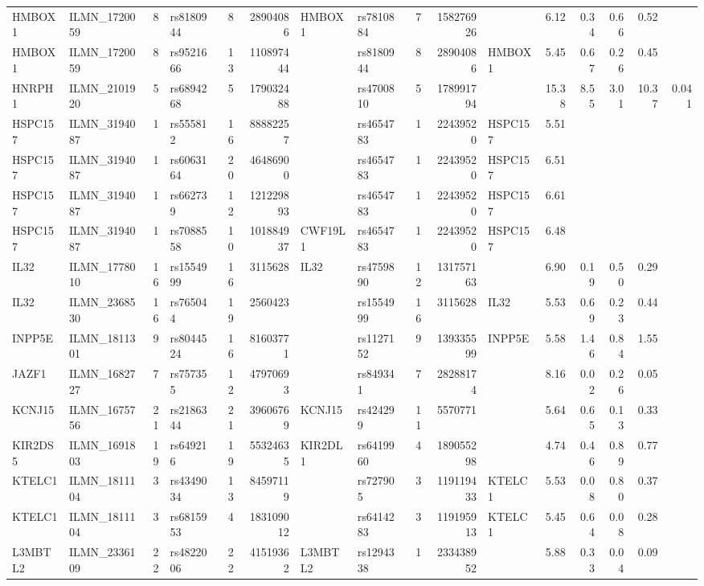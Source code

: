 \documentclass{article}
\begin{document}
\begin{landscape}
{\begin{ThreePartTable}
\begin{longtable}{|llr|lrrl|lrrl|rrrr|r|}
HMBOX1 & ILMN\_1720059 & 8 & rs8180944 & 8 & 28904086 & HMBOX1 & rs7810884 & 7 & 158276926 &  & 6.12 & 0.34 & 0.66 & 0.52 &  \\
HMBOX1 & ILMN\_1720059 & 8 & rs9521666 & 13 & 110897444 &  & rs8180944 & 8 & 28904086 & HMBOX1 & 5.45 & 0.67 & 0.26 & 0.45 &  \\
HNRPH1 & ILMN\_2101920 & 5 & rs6894268 & 5 & 179032488 &  & rs4700810 & 5 & 178991794 &  & 15.38 & 8.55 & 3.01 & 10.37 & 0.041 \\
HSPC157 & ILMN\_3194087 & 1 & rs555812 & 16 & 88882257 &  & rs4654783 & 1 & 22439520 & HSPC157 & 5.51 &  &  &  &  \\
HSPC157 & ILMN\_3194087 & 1 & rs6063164 & 20 & 46486900 &  & rs4654783 & 1 & 22439520 & HSPC157 & 6.51 &  &  &  &  \\
HSPC157 & ILMN\_3194087 & 1 & rs662739 & 12 & 121229893 &  & rs4654783 & 1 & 22439520 & HSPC157 & 6.61 &  &  &  &  \\
HSPC157 & ILMN\_3194087 & 1 & rs7088558 & 10 & 101884937 & CWF19L1 & rs4654783 & 1 & 22439520 & HSPC157 & 6.48 &  &  &  &  \\
IL32 & ILMN\_1778010 & 16 & rs1554999 & 16 & 3115628 & IL32 & rs4759890 & 12 & 131757163 &  & 6.90 & 0.19 & 0.50 & 0.29 &  \\
IL32 & ILMN\_2368530 & 16 & rs765044 & 19 & 2560423 &  & rs1554999 & 16 & 3115628 & IL32 & 5.53 & 0.69 & 0.23 & 0.44 &  \\
INPP5E & ILMN\_1811301 & 9 & rs8044524 & 16 & 81603771 &  & rs1127152 & 9 & 139335599 & INPP5E & 5.58 & 1.46 & 0.84 & 1.55 &  \\
JAZF1 & ILMN\_1682727 & 7 & rs757355 & 12 & 47970693 &  & rs849341 & 7 & 28288174 &  & 8.16 & 0.02 & 0.26 & 0.05 &  \\
KCNJ15 & ILMN\_1675756 & 21 & rs2186344 & 21 & 39606769 & KCNJ15 & rs424299 & 11 & 5570771 &  & 5.64 & 0.65 & 0.13 & 0.33 &  \\
KIR2DS5 & ILMN\_1691803 & 19 & rs649216 & 19 & 55324635 & KIR2DL1 & rs6419960 & 4 & 189055298 &  & 4.74 & 0.46 & 0.89 & 0.77 &  \\
KTELC1 & ILMN\_1811104 & 3 & rs4349034 & 13 & 84597119 &  & rs727905 & 3 & 119119433 & KTELC1 & 5.53 & 0.08 & 0.80 & 0.37 &  \\
KTELC1 & ILMN\_1811104 & 3 & rs6815953 & 4 & 183109012 &  & rs6414283 & 3 & 119195913 & KTELC1 & 5.45 & 0.64 & 0.08 & 0.28 &  \\
L3MBTL2 & ILMN\_2336109 & 22 & rs4822006 & 22 & 41519362 & L3MBTL2 & rs1294338 & 1 & 233438952 &  & 5.88 & 0.33 & 0.04 & 0.09 &  \\

\end{longtable}
\end{ThreePartTable}}
\end{landscape}
\end{document}
